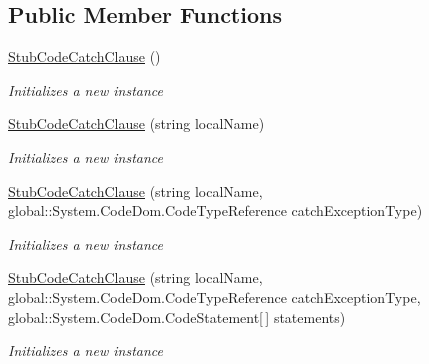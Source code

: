\subsection*{Public Member Functions}
\begin{DoxyCompactItemize}
\item 
\hyperlink{class_system_1_1_code_dom_1_1_fakes_1_1_stub_code_catch_clause_ae3d11886042b0d666633eb777f523d56}{Stub\-Code\-Catch\-Clause} ()
\begin{DoxyCompactList}\small\item\em Initializes a new instance\end{DoxyCompactList}\item 
\hyperlink{class_system_1_1_code_dom_1_1_fakes_1_1_stub_code_catch_clause_a72ab62402036f3c1e9a482a6c1498c5a}{Stub\-Code\-Catch\-Clause} (string local\-Name)
\begin{DoxyCompactList}\small\item\em Initializes a new instance\end{DoxyCompactList}\item 
\hyperlink{class_system_1_1_code_dom_1_1_fakes_1_1_stub_code_catch_clause_a31339ef52201914072f122ad7b3097ad}{Stub\-Code\-Catch\-Clause} (string local\-Name, global\-::\-System.\-Code\-Dom.\-Code\-Type\-Reference catch\-Exception\-Type)
\begin{DoxyCompactList}\small\item\em Initializes a new instance\end{DoxyCompactList}\item 
\hyperlink{class_system_1_1_code_dom_1_1_fakes_1_1_stub_code_catch_clause_a47bd6662a2350727a0ef09db89228fe4}{Stub\-Code\-Catch\-Clause} (string local\-Name, global\-::\-System.\-Code\-Dom.\-Code\-Type\-Reference catch\-Exception\-Type, global\-::\-System.\-Code\-Dom.\-Code\-Statement\mbox{[}$\,$\mbox{]} statements)
\begin{DoxyCompactList}\small\item\em Initializes a new instance\end{DoxyCompactList}\end{DoxyCompactItemize}
